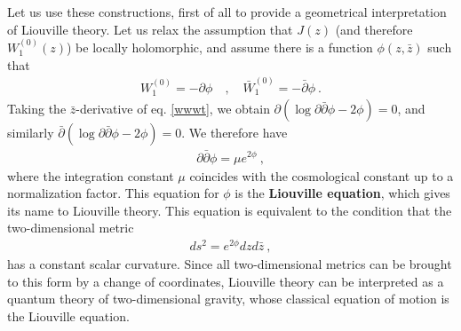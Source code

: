 \documentclass[12pt,a4paper,notitlepage]{report}
\numberwithin{equation}{section}
\theoremstyle{break}
\begin{document}
Let us use these constructions, first of all to provide a geometrical interpretation of Liouville theory.
Let us relax the assumption that $J(z)$ (and therefore $W_1^{(0)}(z)$) be locally holomorphic, and assume there is a function $\phi(z,\bar{z})$ such that 
\begin{align}
 W_1^{(0)} = - \partial \phi \quad , \quad \bar{W}_1^{(0)} = -\bar{\partial} \phi \ .
\end{align}
Taking the $\bar{z}$-derivative of eq. \eqref{wwwt}, we obtain $\partial\left(\log \partial\bar{\partial}\phi -2\phi\right)=0$, and similarly $\bar{\partial} \left(\log \partial\bar{\partial}\phi -2\phi\right)=0$.
We therefore have
\begin{align}
 \partial\bar{\partial}\phi = \mu e^{2\phi}\ ,
\end{align}
where the integration constant $\mu$ coincides with the cosmological constant up to a normalization factor.
This equation for $\phi$ is the \textbf{\boldmath Liouville equation}, which gives its name to Liouville theory.
This equation is equivalent to the condition that the two-dimensional metric
\begin{align}
 ds^2 = e^{2\phi} dz d\bar{z}\ ,
\end{align}
has a constant scalar curvature.
Since all two-dimensional metrics can be brought to this form by a change of coordinates, Liouville theory can be interpreted as a quantum theory of two-dimensional gravity, whose classical equation of motion is the Liouville equation.
\end{document}
